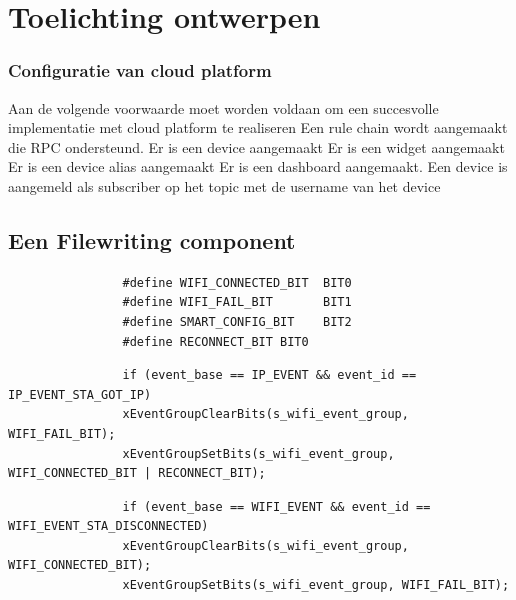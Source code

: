 		\chapter{Toelichting ontwerpen}
		
		
		
		\subsection{Configuratie van cloud platform}
		Aan de volgende voorwaarde moet worden voldaan om een succesvolle implementatie met cloud platform te realiseren
		Een rule chain wordt aangemaakt die RPC ondersteund.
		Er is een device aangemaakt
		Er is een widget aangemaakt
		Er is een device alias aangemaakt
		Er is een dashboard aangemaakt.
		Een device is aangemeld als subscriber op het topic met de username van het device
		
		
		\section{Een Filewriting component}
		
		
		
		
		
		
		\lstset{language=java}
		
		\begin{Aanpassen}
			\begin{lstlisting}
				#define WIFI_CONNECTED_BIT  BIT0
				#define WIFI_FAIL_BIT       BIT1
				#define SMART_CONFIG_BIT    BIT2
				#define RECONNECT_BIT BIT0
			\end{lstlisting}
		\end{Aanpassen}
		
		
		
		\lstset{language=java}
		
		\begin{Aanpassen}
			\begin{lstlisting}
				if (event_base == IP_EVENT && event_id == IP_EVENT_STA_GOT_IP)
				xEventGroupClearBits(s_wifi_event_group, WIFI_FAIL_BIT);
				xEventGroupSetBits(s_wifi_event_group, WIFI_CONNECTED_BIT | RECONNECT_BIT);
			\end{lstlisting}
		\end{Aanpassen}
		
		
		
		\lstset{language=java}
		
		\begin{Aanpassen}
			\begin{lstlisting}
				if (event_base == WIFI_EVENT && event_id == WIFI_EVENT_STA_DISCONNECTED)
				xEventGroupClearBits(s_wifi_event_group, WIFI_CONNECTED_BIT);
				xEventGroupSetBits(s_wifi_event_group, WIFI_FAIL_BIT);
			\end{lstlisting}
		\end{Aanpassen}
		
